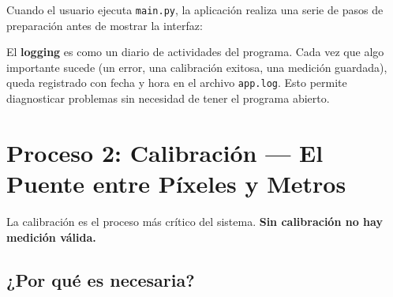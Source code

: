 \documentclass[12pt, a4paper]{article}
\begin{document}
Cuando el usuario ejecuta \texttt{main.py}, la aplicación realiza una serie de
pasos de preparación antes de mostrar la interfaz:

\vspace{0.5cm}
\begin{center}
\end{center}

\vspace{0.4cm}
\begin{infobox}[title=¿Qué es el sistema de logging?]
El \textbf{logging} es como un diario de actividades del programa. Cada vez que algo
importante sucede (un error, una calibración exitosa, una medición guardada), queda
registrado con fecha y hora en el archivo \texttt{app.log}. Esto permite diagnosticar
problemas sin necesidad de tener el programa abierto.
\end{infobox}

\section{Proceso 2: Calibración — El Puente entre Píxeles y Metros}

La calibración es el proceso más crítico del sistema.
\textbf{Sin calibración no hay medición válida.}

\subsection{¿Por qué es necesaria?}
\end{document}

